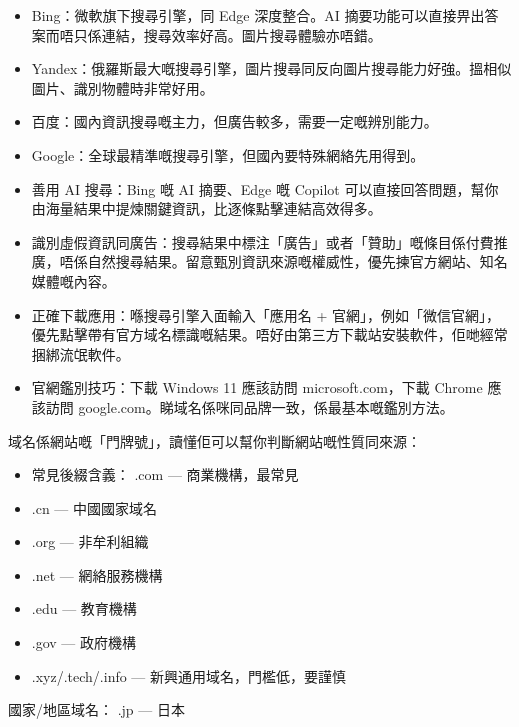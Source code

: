 
\begin{itemize}
  \item Bing：微軟旗下搜尋引擎，同 Edge 深度整合。AI 摘要功能可以直接畀出答案而唔只係連結，搜尋效率好高。圖片搜尋體驗亦唔錯。
  \item Yandex：俄羅斯最大嘅搜尋引擎，圖片搜尋同反向圖片搜尋能力好強。搵相似圖片、識別物體時非常好用。
  \item 百度：國內資訊搜尋嘅主力，但廣告較多，需要一定嘅辨別能力。
  \item Google：全球最精準嘅搜尋引擎，但國內要特殊網絡先用得到。
\end{itemize}


\begin{itemize}
  \item 善用 AI 搜尋：Bing 嘅 AI 摘要、Edge 嘅 Copilot 可以直接回答問題，幫你由海量結果中提煉關鍵資訊，比逐條點擊連結高效得多。
  \item 識別虛假資訊同廣告：搜尋結果中標注「廣告」或者「贊助」嘅條目係付費推廣，唔係自然搜尋結果。留意甄別資訊來源嘅權威性，優先揀官方網站、知名媒體嘅內容。
  \item 正確下載應用：喺搜尋引擎入面輸入「應用名 + 官網」，例如「微信官網」，優先點擊帶有官方域名標識嘅結果。唔好由第三方下載站安裝軟件，佢哋經常捆綁流氓軟件。
  \item 官網鑑別技巧：下載 Windows 11 應該訪問 microsoft.com，下載 Chrome 應該訪問 google.com。睇域名係咪同品牌一致，係最基本嘅鑑別方法。
\end{itemize}


域名係網站嘅「門牌號」，讀懂佢可以幫你判斷網站嘅性質同來源：

\begin{itemize}
  \item 常見後綴含義： .com — 商業機構，最常見
  \item .cn — 中國國家域名
  \item .org — 非牟利組織
  \item .net — 網絡服務機構
  \item .edu — 教育機構
  \item .gov — 政府機構
  \item .xyz/.tech/.info — 新興通用域名，門檻低，要謹慎
\end{itemize}

國家/地區域名： .jp — 日本

